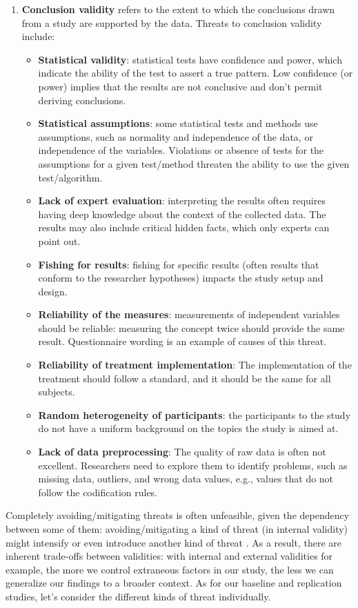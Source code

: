 \begin{enumerate}
    
    \item \textbf{Conclusion validity} refers to the extent to which the conclusions drawn from a study are supported by the data. 
    Threats to conclusion validity include:
    \begin{itemize}
        \item \textbf{Statistical validity}: statistical tests have confidence and power, which indicate the ability of the test to assert a true pattern. Low confidence (or power) implies that the results are not conclusive and don't permit deriving conclusions.
        \item \textbf{Statistical assumptions}: some statistical tests and methods use assumptions, such as normality and independence of the data, or independence of the variables. Violations or absence of tests for the assumptions for a given test/method threaten the ability to use the given test/algorithm.
        \item \textbf{Lack of expert evaluation}: interpreting the results often requires having deep knowledge about the context of the collected data. The results may also include critical hidden facts, which only experts can point out.
        \item \textbf{Fishing for results}: fishing for specific results (often results that conform to the researcher hypotheses) impacts the study setup and design. 
        \item \textbf{Reliability of the measures}: measurements of independent variables should be reliable: measuring the concept twice should provide the same result. Questionnaire wording is an example of causes of this threat.
        \item \textbf{Reliability of treatment implementation}: The implementation of the treatment should follow a standard, and it should be the same for all subjects.
        \item \textbf{Random heterogeneity of participants}: the participants to the study do not have a uniform background on the topics the study is aimed at.
        \item \textbf{Lack of data preprocessing}: The quality of raw data is often not excellent. Researchers need to explore them to identify problems, such as missing data, outliers, and wrong data values, e.g., values that do not follow the codification rules.
    \end{itemize}
\end{enumerate}

Completely avoiding/mitigating threats is often unfeasible, given the dependency between some of them: avoiding/mitigating a kind of threat (\ie in internal validity) might intensify or even introduce another kind of threat \cite{DBLP:books/sp/WohlinRHOR00}. As a result, there are inherent trade-offs between validities: with internal and external validities for example, the more we control extraneous factors in our study, the less we can generalize our findings to a broader context. As for our baseline and replication studies, let's consider the different kinds of threat individually.

